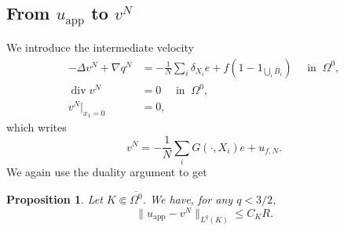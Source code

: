 \documentclass[10pt]{amsart}
\newcommand{\app}{\mathrm{app}}
\renewcommand{\div}{\operatorname{div}}
\theoremstyle{plain}
\newtheorem{prop}[thm]{Proposition}
\theoremstyle{definition}
\let\na\nabla
\let\oldbigcup\bigcup
\begin{document}
\subsection{From $u_{\app}$ to $v^N$}
We introduce the intermediate velocity
\begin{equation} \label{eq:Stokes_v^N}
\begin{aligned}
-\Delta v^N + \na q^N & =-\frac{1}{N} \sum_i\delta_{X_i} e+f(1-1_{\oldbigcup_i B_i}) \quad \text{ in } \: \Omega^0, \\
\div v^N & = 0 \quad \text{ in } \: \Omega^0, \\
v^N \vert_{x_1=0} & = 0,
\end{aligned}
\end{equation}
which writes
\[
v^N=-\frac{1}{N}\sum_iG(\cdot,X_i) e+u_{f,N}.
\]
We again use the duality argument to get
\begin{prop}
Let $K \Subset \overline{\Omega^0}$. We have, for any $q<3/2$,
\[
\| u_{\app}- v^N\|_{L^q(K)} \leq C_K R.
\]
\end{prop}
\end{document}
